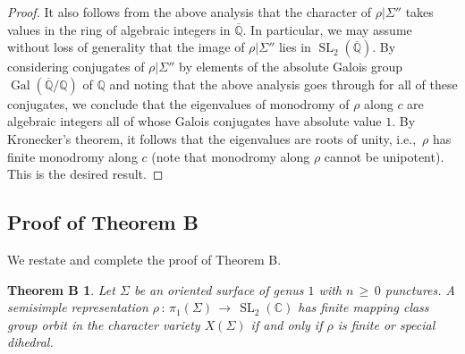 \documentclass[reqno]{amsart}
\theoremstyle{plain}
\newtheorem*{theoremb}{Theorem B}
\theoremstyle{definition}
\theoremstyle{remark}
\newcommand{\C}{{\mathbb{C}}}
\newcommand{\Q}{{\mathbb{Q}}}
\DeclareMathOperator{\Gal}{Gal}
\DeclareMathOperator{\SL}{SL}
\begin{document}
\begin{proof}
It also follows from the above analysis that the character of $\rho|\Sigma''$ takes values in the ring of 
algebraic integers in $\overline{\Q}$. In particular, we may assume without loss of generality that the image 
of $\rho|\Sigma''$ lies in $\SL_2(\overline{\Q})$. By considering conjugates of $\rho|\Sigma''$ by elements of 
the absolute Galois group $\Gal(\overline{\Q}/\Q)$ of $\Q$ and noting that the above analysis goes through for 
all of these conjugates, we conclude that the eigenvalues of monodromy of $\rho$ along $c$ are algebraic 
integers all of whose Galois conjugates have absolute value $1$. By Kronecker's theorem, it follows that the 
eigenvalues are roots of unity, i.e.,~$\rho$ has finite monodromy along $c$ (note that monodromy along $\rho$ 
cannot be unipotent). This is the desired result.
\end{proof}

\subsection{Proof of Theorem B}\label{sec:5.4}
We restate and complete the proof of Theorem B.

\begin{theoremb}
Let $\Sigma$ be an oriented surface of genus $1$ with $n\,\geq\,0$ punctures. A semisimple representation
$\rho\,:\,\pi_1(\Sigma)\,\to\,\SL_2(\C)$ has finite mapping class group orbit in the character variety
$X(\Sigma)$ if and only if $\rho$ is finite or special dihedral.
\end{theoremb}
\end{document}
